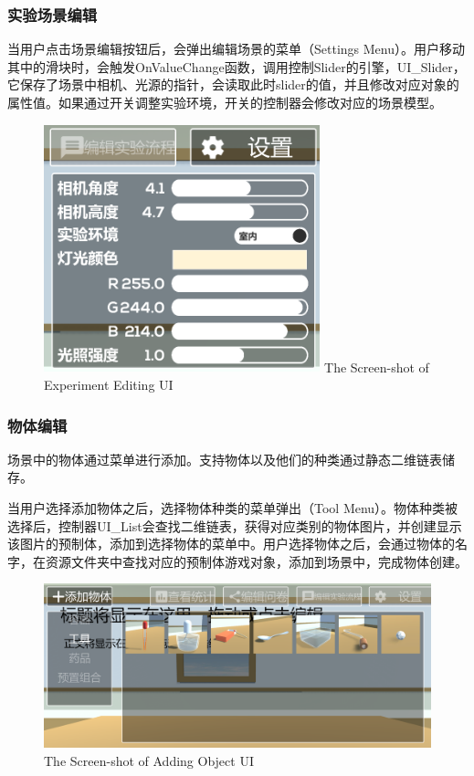 \subsubsection{实验场景编辑}
当用户点击场景编辑按钮后，会弹出编辑场景的菜单（Settings Menu）。用户移动其中的滑块时，会触发OnValueChange函数，调用控制Slider的引擎，UI\_Slider，它保存了场景中相机、光源的指针，会读取此时slider的值，并且修改对应对象的属性值。如果通过开关调整实验环境，开关的控制器会修改对应的场景模型。

\begin{figure}[!htp]
  \centering
  \includegraphics[width=8cm]{figure/settings.png}
    {The Screen-shot of Experiment Editing UI}
 \label{fig:gm}
\end{figure}

\subsubsection{物体编辑}
场景中的物体通过菜单进行添加。支持物体以及他们的种类通过静态二维链表储存。

	当用户选择添加物体之后，选择物体种类的菜单弹出（Tool Menu）。物体种类被选择后，控制器UI\_List会查找二维链表，获得对应类别的物体图片，并创建显示该图片的预制体，添加到选择物体的菜单中。用户选择物体之后，会通过物体的名字，在资源文件夹中查找对应的预制体游戏对象，添加到场景中，完成物体创建。
	
\begin{figure}[!htp]
  \centering
  \includegraphics[width=12cm]{figure/addObj.png}
    {The Screen-shot of Adding Object UI}
 \label{fig:gm}
\end{figure}

